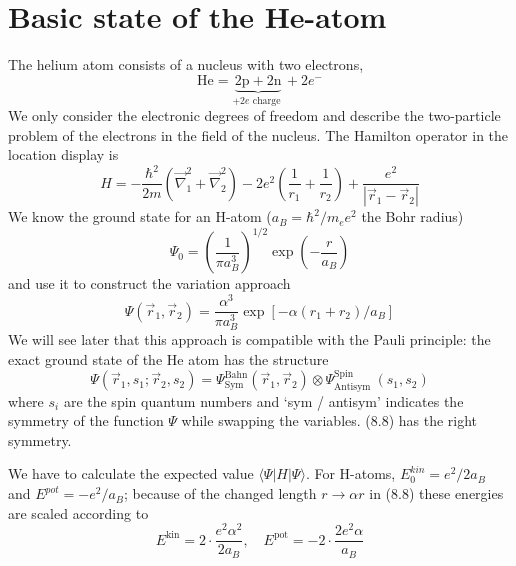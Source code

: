\section{Basic state of the He-atom}
The helium atom consists of a nucleus with two electrons,
\begin{equation}
    \mathrm{He}=\underbrace{2 \mathrm{p}+2 \mathrm{n}}_{+2 e \text { charge }}+2 e^{-}
    \end{equation}
We only consider the electronic degrees of freedom and describe the two-particle problem of the electrons in the field of the nucleus. The Hamilton operator in the location display is
\begin{equation}
    H=-\frac{\hbar^{2}}{2 m}\left(\vec{\nabla}_{1}^{2}+\vec{\nabla}_{2}^{2}\right)-2 e^{2}\left(\frac{1}{r_{1}}+\frac{1}{r_{2}}\right)+\frac{e^{2}}{\left|\vec{r}_{1}-\vec{r}_{2}\right|}
    \end{equation}
We know the ground state for an H-atom ($a_B=\hbar^2/m_ee^2$ the Bohr radius)
\begin{equation}
    \Psi_{0}=\left(\frac{1}{\pi a_{B}^{3}}\right)^{1 / 2} \exp \left(-\frac{r}{a_{B}}\right)
    \end{equation}
and use it to construct the variation approach
\begin{equation}
    \Psi\left(\vec{r}_{1}, \vec{r}_{2}\right)=\frac{\alpha^{3}}{\pi a_{B}^{3}} \exp \left[-\alpha\left(r_{1}+r_{2}\right) / a_{B}\right]
    \end{equation}
We will see later that this approach is compatible with the Pauli principle: the exact ground state of the He atom has the structure
\begin{equation}
    \Psi\left(\vec{r}_{1}, s_{1} ; \vec{r}_{2}, s_{2}\right)=\Psi_{\mathrm{Sym}}^{\mathrm{Bahn}}\left(\vec{r}_{1}, \vec{r}_{2}\right) \otimes \Psi_{\text {Antisym }}^{\mathrm{Spin}}\left(s_{1}, s_{2}\right)
    \end{equation}
where $s_i$ are the spin quantum numbers and ‘sym / antisym’ indicates the symmetry of the function $\Psi$ while swapping the variables. (8.8) has the right symmetry.\par
We have to calculate the expected value $\langle\Psi|H|\Psi\rangle$. For H-atoms, $E_0^{kin}=e^2/2a_B$ and $E^{pot} = -e^2 / a_B$; because of the changed length $r \rightarrow\alpha r$ in (8.8) these energies are scaled according to
\begin{equation}
    E^{\mathrm{kin}}=2 \cdot \frac{e^{2} \alpha^{2}}{2 a_{B}}, \quad E^{\mathrm{pot}}=-2 \cdot \frac{2 e^{2} \alpha}{a_{B}}
    \end{equation}
